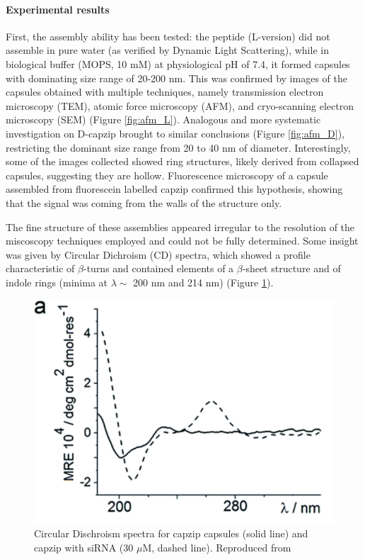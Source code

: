 \paragraph{Experimental results} First, the assembly ability has been tested: the peptide (L-version) did not assemble in pure water (as verified by Dynamic Light Scattering), while in biological buffer (MOPS, 10 mM) at physiological pH of 7.4, it formed capsules with dominating size range of 20-200 nm. This was confirmed by images of the capsules obtained with multiple techniques, namely transmission electron microscopy (TEM), atomic force microscopy (AFM), and cryo-scanning electron microscopy (SEM) (Figure \ref{fig:afm_L}).
%
Analogous and more systematic investigation on D-capzip brought to similar conclusions (Figure \ref{fig:afm_D}), restricting the dominant size range from 20 to 40 nm of diameter.
%
Interestingly, some of the images collected showed ring structures, likely derived from collapsed capsules, suggesting they are hollow. 
%
Fluorescence microscopy of a capsule assembled from fluorescein labelled capzip confirmed this hypothesis, showing that the signal was coming from the walls of the structure only.

The fine structure of these assemblies appeared irregular to the resolution of the miscoscopy techniques employed and could not be fully determined. Some insight was given by Circular Dichroism (CD) spectra, which showed a profile characteristic of $\beta$-turns and contained elements of a $\beta$-sheet structure and of indole rings (minima at $\lambda \sim$ 200 nm and 214 nm) (Figure \ref{fig:exp_CD}).

\begin{figure}
\begin{center}
\includegraphics[width=0.6\linewidth, align = c]{1introduction/pics/CD_capzip.png}
\caption[Circular Dischroism specturm of capzip capsules]{Circular Dischroism spectra for capzip  capsules (solid line) and capzip with siRNA (30 $\mu$M, dashed line). Reproduced from \citet{Castelletto2016}} \label{fig:exp_CD}
\end{center}
\end{figure}


